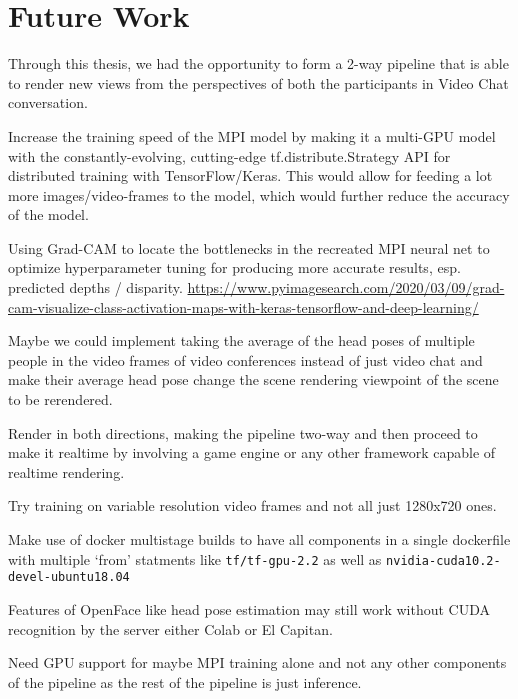 \section{Future Work}\label{sec:future-work}

Through this thesis, we had the opportunity to form a 2-way pipeline that is able to render new views from the perspectives of both the participants in Video Chat conversation.

Increase the training speed of the MPI model by making it a multi-GPU model with the constantly-evolving, cutting-edge tf.distribute.Strategy API for distributed training with TensorFlow/Keras.
This would allow for feeding a lot more images/video-frames to the model, which would further reduce the accuracy of the model.

Using Grad-CAM to locate the bottlenecks in the recreated MPI neural net to optimize hyperparameter tuning for producing more accurate results, esp. predicted depths / disparity.
\url{https://www.pyimagesearch.com/2020/03/09/grad-cam-visualize-class-activation-maps-with-keras-tensorflow-and-deep-learning/}

Maybe we could implement taking the average of the head poses of multiple people in the video frames of video conferences instead of just video chat and make their average head pose change the scene rendering viewpoint of the scene to be rerendered.

Render in both directions, making the pipeline two-way and then proceed to make it realtime by involving a game engine or any other framework capable of realtime rendering. 

Try training on variable resolution video frames and not all just 1280x720 ones.


Make use of docker multistage builds to have all components in a single dockerfile with multiple `from' statments like \texttt{tf/tf-gpu-2.2} as well as \texttt{nvidia-cuda10.2-devel-ubuntu18.04}



Features of OpenFace like head pose estimation may still work without CUDA recognition by the server either Colab or El Capitan. 

Need GPU support for maybe MPI training alone and not any other components of the pipeline as the rest of the pipeline is just inference.

